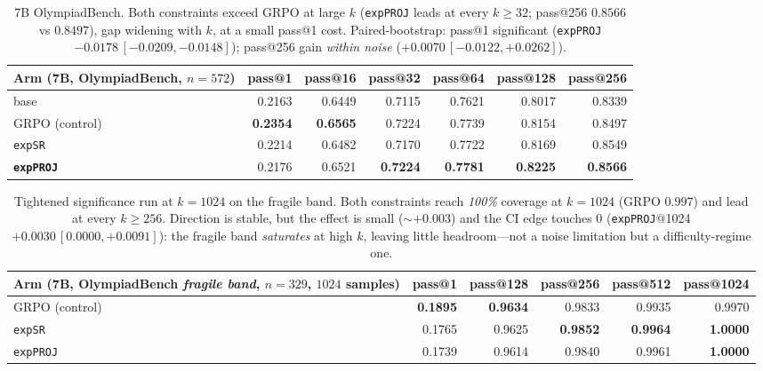 \documentclass[11pt]{article}
\theoremstyle{definition}
\begin{document}
\begin{table}[h]\centering\small
\begin{tabular}{lrrrrrr}
\toprule
Arm (7B, OlympiadBench, $n{=}572$) & pass@1 & pass@16 & pass@32 & pass@64 & pass@128 & pass@256\\
\midrule
base                & 0.2163 & 0.6449 & 0.7115 & 0.7621 & 0.8017 & 0.8339\\
GRPO (control)      & \textbf{0.2354} & \textbf{0.6565} & 0.7224 & 0.7739 & 0.8154 & 0.8497\\
\texttt{expSR}      & 0.2214 & 0.6482 & 0.7170 & 0.7722 & 0.8169 & 0.8549\\
\textbf{\texttt{expPROJ}} & 0.2176 & 0.6521 & \textbf{0.7224} & \textbf{0.7781} & \textbf{0.8225} & \textbf{0.8566}\\
\bottomrule
\end{tabular}
\caption{7B OlympiadBench. Both constraints exceed GRPO at large $k$ (\texttt{expPROJ} leads at every
$k\ge32$; pass@256 $0.8566$ vs $0.8497$), gap widening with $k$, at a small pass@1 cost.
Paired-bootstrap: pass@1 significant (\texttt{expPROJ} $-0.0178\,[-0.0209,-0.0148]$); pass@256 gain
\emph{within noise} ($+0.0070\,[-0.0122,+0.0262]$).}
\label{tab:oly7b}
\end{table}

\begin{table}[h]\centering\small
\begin{tabular}{lrrrrr}
\toprule
Arm (7B, OlympiadBench \emph{fragile band}, $n{=}329$, $1024$ samples) & pass@1 & pass@128 & pass@256 & pass@512 & pass@1024\\
\midrule
GRPO (control)      & \textbf{0.1895} & \textbf{0.9634} & 0.9833 & 0.9935 & 0.9970\\
\texttt{expSR}      & 0.1765 & 0.9625 & \textbf{0.9852} & \textbf{0.9964} & \textbf{1.0000}\\
\texttt{expPROJ}    & 0.1739 & 0.9614 & 0.9840 & 0.9961 & \textbf{1.0000}\\
\bottomrule
\end{tabular}
\caption{Tightened significance run at $k{=}1024$ on the fragile band. Both constraints reach
\emph{100\%} coverage at $k{=}1024$ (GRPO $0.997$) and lead at every $k\ge256$. Direction is stable,
but the effect is small ($\sim{+}0.003$) and the CI edge touches $0$
(\texttt{expPROJ}@1024 $+0.0030\,[0.0000,+0.0091]$): the fragile band \emph{saturates} at high $k$,
leaving little headroom---not a noise limitation but a difficulty-regime one.}
\label{tab:frag1024}
\end{table}
\end{document}
